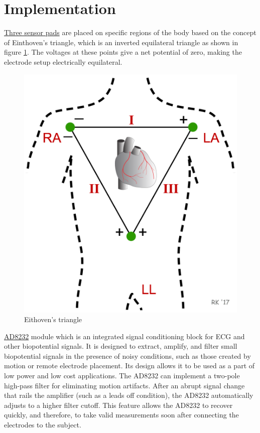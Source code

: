 \documentclass[11pt]{article}
\theoremstyle{definition}
\begin{document}
  \section{Implementation}
  \underline{Three sensor pads} are placed on specific regions of the body based on the concept of Einthoven’s triangle\cite{abi2019einthoven}, which is an inverted equilateral triangle as shown in figure \ref{fig:eithoven_triangle}. The voltages at these points give a net potential of zero, making the electrode setup electrically equilateral.

  \begin{figure}[h]
    \centering
    \includegraphics[scale=0.1]{images/eithoven_triangle.png}
    \caption{Eithoven's triangle\cite{cvp:ECG_eithoven}}
    \label{fig:eithoven_triangle}
  \end{figure}

  \underline{AD8232}\cite{ae:ad8232} module which is an integrated signal conditioning block for ECG and other biopotential signals.
  It is designed to extract, amplify, and filter small biopotential signals in the presence of noisy conditions, such as those created by motion or remote electrode placement.
  Its design allows it to be used as a part of low power and low cost applications.
  The AD8232 can implement a two-pole high-pass filter for eliminating motion artifacts.
  After an abrupt signal change that rails the amplifier (such as a leads off condition), the AD8232 automatically adjusts to a higher filter cutoff.
  This feature allows the AD8232 to recover quickly, and therefore, to take valid measurements soon after connecting the electrodes to the subject.
\end{document}
